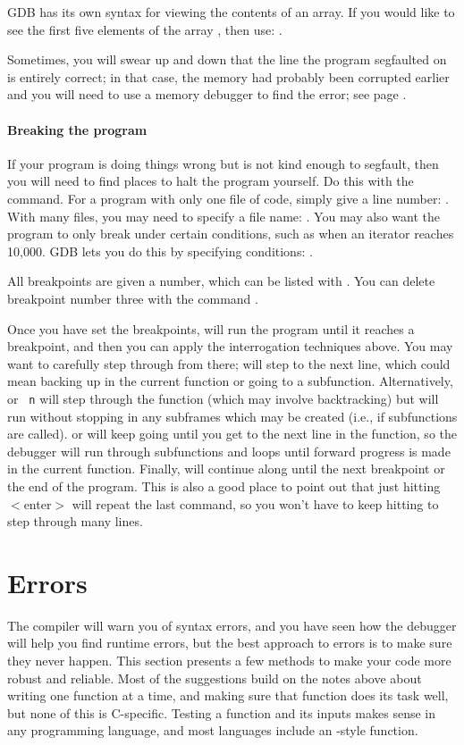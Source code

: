 \documentclass[12pt]{article}
\begin{document}
GDB has its own syntax for viewing the contents of an array. If you
would like to see the first five elements of the array ,
then use: .

Sometimes, you will swear up and down that the line the program segfaulted on is
entirely correct; in that case, the memory had probably been corrupted
earlier and you will need to use a memory debugger to find the error;
see page \pageref{valgrind}.

\paragraph{Breaking the program} If your program is doing things wrong but is not kind
enough to segfault, then you will need to find places to halt the program
yourself. Do this with the  command. For a program with only
one file of code, simply give a line number: . With many
files, you may need to specify a file name: . You
may also want the program to only break under certain conditions, such
as when an iterator reaches 10,000. GDB lets you do this by specifying
conditions: .

All breakpoints are given a number, which can be listed with
. You can delete breakpoint number three with
the command .

Once you have set the breakpoints,  will run the program until it
reaches a breakpoint, and then you can apply the interrogation techniques
above. You may want to carefully step through from there; 
will step to the next line, which could mean backing up in the current
function or going to a subfunction. Alternatively,  or {\tt
n} will step through the function (which may involve backtracking) but
will run without stopping in any subframes which may be created
(i.e., if subfunctions are called).   or  will keep
going until you get to the next line in the function, so the debugger
will run through subfunctions and loops until forward progress is made
in the current function.  Finally,  will continue along until the next
breakpoint or the end of the program. This is also a good place to
point out that just hitting $<$enter$>$ will repeat the last command,
so you won't have to keep hitting  to step through many lines.

\section{\treesymbol Errors} The compiler will warn you of syntax
errors, and you have seen how the debugger will help you find runtime
errors, but the best approach to errors is to make sure they never
happen. This section presents a few methods to make your code more
robust and reliable. Most of the suggestions build on the notes above
about writing one function at a time, and making sure that function does
its task well, but
none of this is C-specific. Testing a function and its inputs makes
sense in any programming language, and most languages include an 
-style function.
\end{document}
